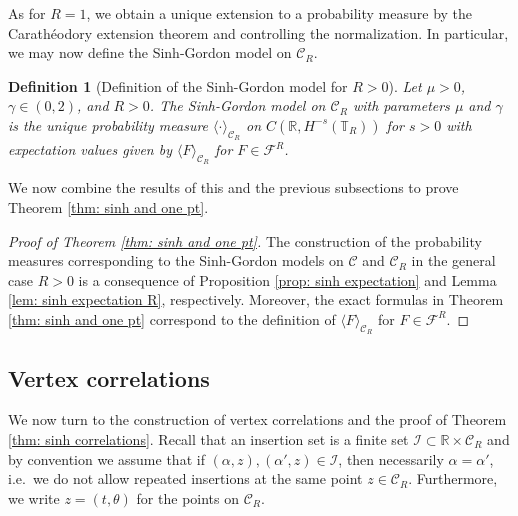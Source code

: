 \documentclass[11pt]{amsart}
\numberwithin{equation}{section}
\newcounter{exa}
\newtheorem{definition}[theorem]{Definition}
\theoremstyle{definition}
\newcommand{\R}{\mathbb{R}}
\newcommand{\mc}{\mathcal}
\def\T{\mathbb{T}}
\begin{document}
As for $R=1$, we obtain a unique extension to a probability measure by the Carath\'eodory extension theorem and controlling the normalization. In particular, we may now define the Sinh-Gordon model on $\mathcal{C}_R$.
\begin{definition}[Definition of the Sinh-Gordon model for $R>0$]
Let $\mu >0$, $\gamma \in (0,2)$, and $R>0$. The Sinh-Gordon model on $\mathcal{C}_{R}$ with parameters $\mu$ and $\gamma$ is the unique probability measure $\langle \cdot \rangle_{\mc{C}_R}$ on $C(\R,H^{-s}(\T_R))$ for $s>0$ with expectation values given by $\langle F \rangle_{\mc{C}_R}$ for $F \in \mathcal F^R$.
\end{definition} 


We now combine the results of this and the previous subsections to prove Theorem \ref{thm: sinh and one pt}.
\begin{proof}[Proof of Theorem \ref{thm: sinh and one pt}]
The construction of the probability measures corresponding to the Sinh-Gordon models on $\mathcal{C}$ and $\mathcal{C}_R$ in the general case $R>0$ is a consequence of Proposition \ref{prop: sinh expectation} and Lemma \ref{lem: sinh expectation R}, respectively. Moreover, the exact formulas in Theorem \ref{thm: sinh and one pt} correspond to the definition of $\langle F \rangle_{\mc{C}_R}$ for $F \in \mathcal F^R$.
\end{proof}

\subsection{Vertex correlations} \label{subsec:_vertex_correlations}

We now turn to the construction of vertex correlations and the proof of Theorem \ref{thm: sinh correlations}. Recall that an insertion set is a finite set $\mathcal{I} \subset \mathbb{R} \times \mc{C}_R$ and by convention we assume that if $(\alpha,z), (\alpha',z) \in \mathcal{I}$, then necessarily $\alpha = \alpha'$, i.e.\ we do not allow repeated insertions at the same point $z\in \mc{C}_R$. Furthermore, we write $z=(t,\theta)$ for the points on $\mc{C}_R$.
 
\end{document}
